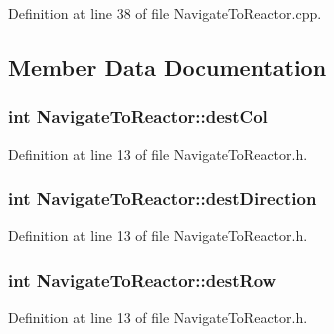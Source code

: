 Definition at line 38 of file Navigate\-To\-Reactor.\-cpp.



\subsection{Member Data Documentation}
\hypertarget{classNavigateToReactor_aeb3c4d3f99db073e52159adf49e8466f}{
\subsubsection[{dest\-Col}]{\setlength{\rightskip}{0pt plus 5cm}int Navigate\-To\-Reactor\-::dest\-Col\hspace{0.3cm}{\ttfamily [private]}}}\label{classNavigateToReactor_aeb3c4d3f99db073e52159adf49e8466f}


Definition at line 13 of file Navigate\-To\-Reactor.\-h.

\hypertarget{classNavigateToReactor_a5e50c32838a4f3f715fb578244637198}{
\subsubsection[{dest\-Direction}]{\setlength{\rightskip}{0pt plus 5cm}int Navigate\-To\-Reactor\-::dest\-Direction\hspace{0.3cm}{\ttfamily [private]}}}\label{classNavigateToReactor_a5e50c32838a4f3f715fb578244637198}


Definition at line 13 of file Navigate\-To\-Reactor.\-h.

\hypertarget{classNavigateToReactor_a655eb6b0e47b6bf4c6cf1aeb91b18694}{
\subsubsection[{dest\-Row}]{\setlength{\rightskip}{0pt plus 5cm}int Navigate\-To\-Reactor\-::dest\-Row\hspace{0.3cm}{\ttfamily [private]}}}\label{classNavigateToReactor_a655eb6b0e47b6bf4c6cf1aeb91b18694}


Definition at line 13 of file Navigate\-To\-Reactor.\-h.

